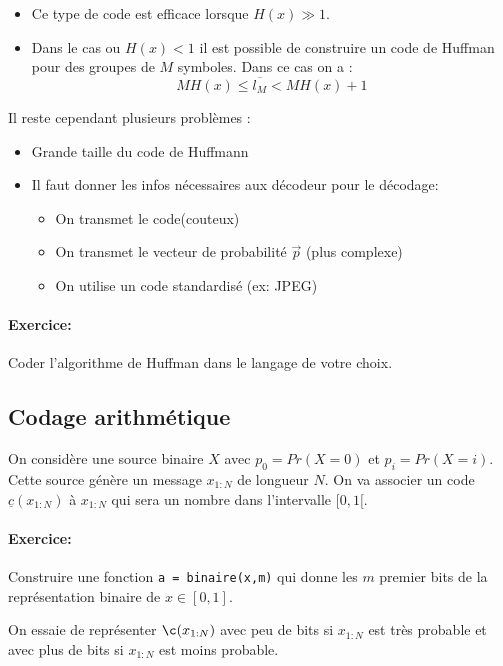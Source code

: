 \documentclass[main.tex]{subfiles}
\begin{document}
\begin{rem}
  \begin{itemize}
  \item Ce type de code est efficace lorsque $H(x) \gg 1$.

  \item Dans le cas ou $H(x)< 1$ il est possible de construire un code de Huffman pour des groupes de $M$ symboles. Dans ce cas on a :
    \[
      MH(x) \le \overline{l_M} < MH(x)+1
    \]
\end{itemize}
\end{rem}
Il reste cependant plusieurs problèmes :
\begin{itemize}
\item Grande taille du code de Huffmann
\item Il faut donner les infos nécessaires aux décodeur pour le décodage:
  \begin{itemize}
  \item On transmet le code(couteux)
  \item On transmet le vecteur de probabilité $\vec{p}$ (plus complexe)
  \item On utilise un code standardisé (ex: JPEG)
  \end{itemize}
\end{itemize}
\paragraph{Exercice:} Coder l'algorithme de Huffman dans le langage de votre choix.

\subsection{Codage arithmétique}

On considère une source binaire $X$ avec $p_0=Pr(X=0)$ et $p_i=Pr(X=i)$.
Cette source génère un message $x_{1:N}$ de longueur $N$.
On va associer un code $\underline{c}(x_{1:N})$ à $x_{1:N}$ qui sera un nombre dans l'intervalle $[0,1[$.


\paragraph{Exercice:} Construire une fonction \texttt{a = binaire(x,m)} qui donne les $m$ premier bits de la représentation binaire de $x\in [0,1]$.

On essaie de représenter $\c(x_{1:N})$ avec peu de bits si $x_{1:N}$ est très probable et avec plus de bits si $x_{1:N}$ est moins probable.
\end{document}
